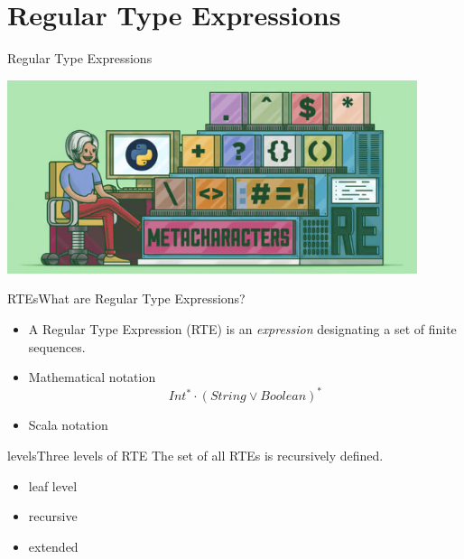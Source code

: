 \section{Regular Type Expressions}

\begin{frame}{Regular Type Expressions}
  \centering
  
  \includegraphics[width=0.9\textwidth]{regexp.png}
\end{frame}


\newsavebox\exnotebox
\begin{lrbox}{\exnotebox}
  \begin{minipage}{7cm}
    
  \end{minipage}
\end{lrbox}


\begin{frame}{RTEs}{What are Regular Type Expressions?}
  \begin{itemize}
  \item A Regular Type Expression (RTE) is an \emph{expression} designating a set  of finite sequences.
  \item Mathematical notation
    \[Int^* \cdot (String \vee Boolean)^*\]
  \item Scala notation\\
    \usebox\exnotebox
  \end{itemize}
\end{frame}

\begin{frame}{levels}{Three levels of RTE}
  The set of all RTEs is recursively defined.
  \begin{itemize}
  \item leaf level
  \item recursive
  \item extended
  \end{itemize}
\end{frame}

